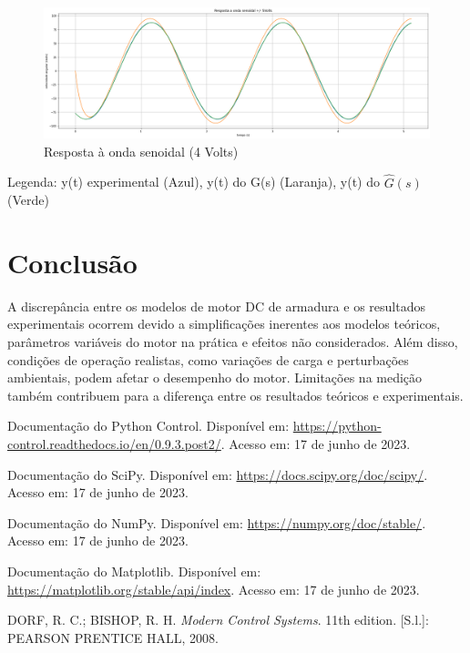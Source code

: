 \documentclass[10pt]{article}
\begin{document}
\begin{figure}[h]
    \centering
    \includegraphics[scale=0.32]{respostasin5.png}
    \caption{Resposta à onda senoidal (4 Volts)}
\end{figure}

\quad Legenda: y(t) experimental (Azul), y(t) do G(s) (Laranja), y(t) do $\hat{G}(s)$ (Verde)

\section{Conclusão}

\quad A discrepância entre os modelos de motor DC de armadura e os resultados experimentais ocorrem devido a simplificações inerentes aos modelos teóricos, parâmetros variáveis do motor na prática e efeitos não considerados.
Além disso, condições de operação realistas, como variações de carga e perturbações ambientais, podem afetar o desempenho do motor.
Limitações na medição também contribuem para a diferença entre os resultados teóricos e experimentais.

\begin{thebibliography}{99}
     Documentação do Python Control. Disponível em: \url{https://python-control.readthedocs.io/en/0.9.3.post2/}. Acesso em: 17 de junho de 2023.
    
     Documentação do SciPy. Disponível em: \url{https://docs.scipy.org/doc/scipy/}. Acesso em: 17 de junho de 2023.

     Documentação do NumPy. Disponível em: \url{https://numpy.org/doc/stable/}. Acesso em: 17 de junho de 2023.
    
     Documentação do Matplotlib. Disponível em: \url{https://matplotlib.org/stable/api/index}. Acesso em: 17 de junho de 2023.

     DORF, R. C.; BISHOP, R. H. \textit{Modern Control Systems}. 11th edition. [S.l.]: PEARSON PRENTICE HALL, 2008.
\end{thebibliography}
\end{document}
